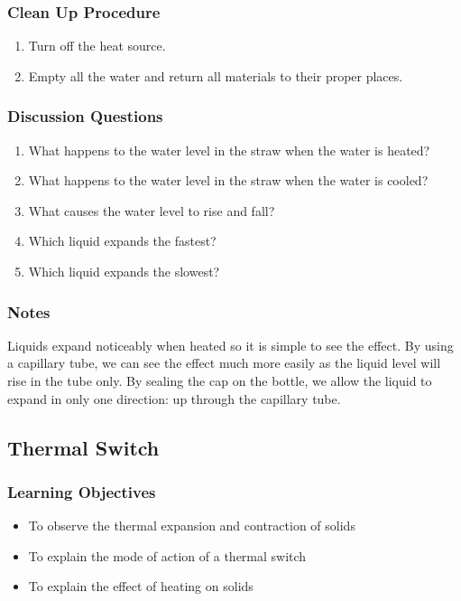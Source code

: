 \subsubsection*{Clean Up Procedure}
\begin{enumerate}
\item{Turn off the heat source.} 
\item{Empty all the water and return all materials to their proper places.} 
\end{enumerate}

\subsubsection*{Discussion Questions}
\begin{enumerate}
\item{What happens to the water level in the straw when the water is heated?}
\item{What happens to the water level in the straw when the water is cooled?}
\item{What causes the water level to rise and fall?}
\item{Which liquid expands the fastest?}
\item{Which liquid expands the slowest?}
\end{enumerate}

\subsubsection*{Notes}
Liquids expand noticeably when heated so it is simple to see the effect. By using a capillary tube, we can see the effect much more easily as the liquid level will rise in the tube only. By sealing the cap on the bottle, we allow the liquid to expand in only one direction: up through the capillary tube.  

\subsection{Thermal Switch}

\subsubsection*{Learning Objectives}
\begin{itemize}
\item{To observe the thermal expansion and contraction of solids} 
\item{To explain the mode of action of a thermal switch} 
\item{To explain the effect of heating on solids} 
\end{itemize}

